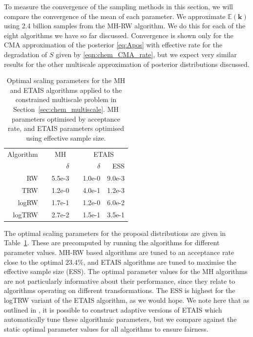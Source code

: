 \documentclass[final]{siamltex}
\begin{document}
To measure the convergence of the sampling methods in this section, we
will compare the convergence of the mean of each parameter. We
approximate $\mathbb{E}(\mathbf{k})$ using 2.4 billion samples from
the MH-RW algorithm. We do this for each of the eight algorithms we
have so far discussed. Convergence is shown only for the CMA
approximation of the posterior \eqref{eq:Apos} with effective rate for
the degradation of $S$ given by \eqref{eqn:chem_CMA_rate}, but we
expect very similar results for the other multiscale approximation of
posterior distributions
discussed.

\begin{table}[!h]
\centering
\begin{tabular}{rrrrrr}
\toprule
	\multicolumn{1}{l}{Algorithm} & \multicolumn{3}{c}{MH} & \multicolumn{2}{c}{ETAIS} \\ \cmidrule(lr){2-4} \cmidrule(lr){5-6}
	& & $\delta$ & & $\delta$ & ESS \\ \midrule
	RW & & 5.5e-3 & & 1.0e-0 & 9.0e-3 \\
	TRW & & 1.2e-0 & & 4.0e-1 & 1.2e-3 \\
	logRW & & 1.7e-1 & & 1.2e-0 & 6.0e-2 \\
	logTRW & & 2.7e-2 & & 1.5e-1 & 3.5e-1 \\
\bottomrule
\end{tabular}
\caption{Optimal scaling parameters for the MH and ETAIS algorithms applied to the constrained multiscale problem in Section~\ref{sec:chem_multiscale}. MH parameters optimised by acceptance rate, and ETAIS parameters optimised using effective sample size.}
\label{tab:chem_multiscale_scaling}
\end{table}

The optimal scaling parameters for the proposal distributions are
given in Table~\ref{tab:chem_multiscale_scaling}. These are
precomputed by running the algorithms for different parameter
values. MH-RW based algorithms are tuned to an acceptance rate close
to the optimal $23.4\%$, and ETAIS algorithms are tuned to maximise the
effective sample size (ESS). The optimal parameter values for the MH
algorithms are not particularly informative about their performance,
since they relate to algorithms operating on different
transformations. The ESS is highest for the logTRW variant
of the ETAIS algorithm, as we would hope. We note here that as
outlined in \cite{cotter2015parallel}, it is possible to construct
adaptive versions of ETAIS which automatically tune these algorithmic
parameters, but we compare against the static optimal parameter values
for all algorithms to ensure fairness.
\end{document}
